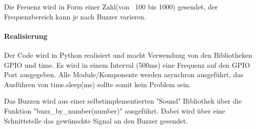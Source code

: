 \documentclass[../../main.tex]{subfiles}
\begin{document}
Die Freuenz wird in Form einer Zahl(von ~100 bis 1000) gesendet, der Frequenzbereich kann je nach Buzzer varieren.

\paragraph{Realisierung}
Der Code wird in Python realisiert und macht Verwendung von den Bibliotheken GPIO und time. Es wird in einem Interval (500ms) eine Frequenz auf den GPIO Port ausgegeben. Alle Module/Komponente werden asynchron ausgeführt, das Ausführen von time.sleep(ms) sollte somit kein Problem sein.

Das Buzzen wird aus einer selbstimplementierten "Sound" Bibliothek über die Funktion "buzz\_by\_number(number)" ausgeführt. Dabei wird über eine Schnittstelle das gewünschte Signal an den Buzzer gesendet.
\end{document}
